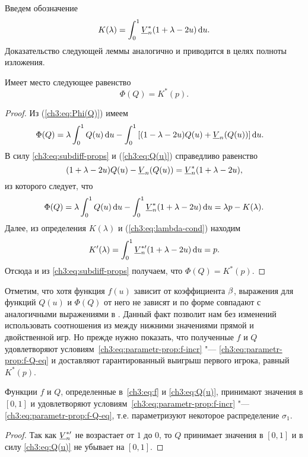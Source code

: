{Введем обозначение
\begin{equation*}
  K(\lambda) = \int_0^1 \LV[*]{n}(1+\lambda-2u) \di u.
\end{equation*}
Доказательство следующей леммы аналогично \cite{demeyer02} и приводится в целях полноты изложения.
\begin{lemma}
  Имеет место следующее равенство
  \begin{equation}\label{ch3:eq:phi=k*}
    \Phi(Q) = K^*(p).
  \end{equation}
\end{lemma}
\begin{proof}
  Из (\ref{ch3:eq:Phi(Q)}) имеем
  \begin{align*}
    \Phi(Q)
    &= \lambda \int_0^1 Q(u) \di u
    - \int_0^1 \left[ (1-\lambda-2u) Q(u) + \LV{n}(Q(u)) \right] \di u.
  \end{align*}
  В силу \eqref{ch3:eq:subdiff-props} и (\ref{ch3:eq:Q(u)}) справедливо равенство
  \begin{equation*}
    (1+\lambda-2u) Q(u) - \LV{n}(Q(u)) = \LV[*]{n}(1+\lambda-2u),
  \end{equation*}
  из которого следует, что
  \begin{align*}
    \Phi(Q)
    = \lambda \int_0^1 Q(u) \di u - \int_0^1 \LV[*]{n}(1+\lambda-2u) \di u = \lambda p - K(\lambda).
  \end{align*}
  Далее, из определения $K(\lambda)$ и (\ref{ch3:eq:lambda-cond}) находим
  \[
    K'(\lambda) = \int_0^1 \LV[*\prime]{n}(1+\lambda-2u) \di u = p.
  \]
  Отсюда и из \eqref{ch3:eq:subdiff-props} получаем, что $\Phi(Q) = K^*(p)$.
\end{proof}

Отметим, что хотя функция $f(u)$ зависит от коэффициента $\beta$, выражения для функций $Q(u)$ и $\Phi(Q)$ от него не зависят и по форме совпадают с аналогичными выражениями в \cite{demeyer02}.
Данный факт позволит нам без изменений использовать соотношения из \cite{demeyer02} между нижними значениями прямой и двойственной игр.
Но прежде нужно показать, что полученные $f$ и $Q$ удовлетворяют условиям~\eqref{ch3:eq:parametr-prop:f-incr} "--- \eqref{ch3:eq:parametr-prop:f-Q-eq} и доставляют гарантированный выигрыш первого игрока, равный $K^*(p)$.

\begin{lemma}
  \label{ch3:lem:f-Q-is-strategy}
  Функции $f$ и $Q$\textnormal{,} определенные в~\eqref{ch3:eq:f} и \eqref{ch3:eq:Q(u)}\textnormal{,} принимают значения в $[0, 1]$ и удовлетворяют условиям~\eqref{ch3:eq:parametr-prop:f-incr} "--- \eqref{ch3:eq:parametr-prop:f-Q-eq}\textnormal{,} т.е. параметризуют некоторое распределение $\sigma_1$.
\end{lemma}
\begin{proof}
  Так как $\LV[ *\prime ]{n}$ не возрастает от $1$ до $0$, то $Q$ принимает значения в $[0, 1]$ и в силу \eqref{ch3:eq:Q(u)} не убывает на $[0, 1]$.


\end{proof}}
